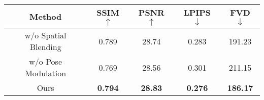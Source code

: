 \begin{tabular}{@{}ccccc@{}}
\toprule
Method & SSIM $\uparrow$ & PSNR $\uparrow$& LPIPS $\downarrow$& FVD  $\downarrow$                      \\ \midrule
w/o Spatial Blending  & 0.789           & 28.74            & 0.283        & 191.23   \\
w/o Pose Modulation  & 0.769           & 28.56            & 0.301        & 211.15   \\
Ours           & \textbf{0.794}            & \textbf{28.83}            & \textbf{0.276}            & \textbf{186.17}            \\ \bottomrule
\end{tabular}